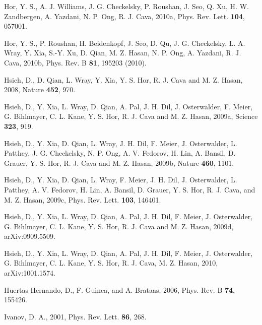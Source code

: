 \documentclass[twocolumn,floatfix,showpacs,rmp,aps]{revtex4}
\begin{document}
\begin{thebibliography}{99}
		Hor, Y. S., A. J. Williams, J. G. Checkelsky, P. Roushan, J. Seo, Q. Xu, H. W. Zandbergen,
		A. Yazdani, N. P. Ong, R. J. Cava, 2010a,
		Phys. Rev. Lett. {\bf 104}, 057001.
		
		Hor, Y. S., P. Roushan, H. Beidenkopf, J. Seo, D. Qu, J. G. Checkelsky,
		L. A. Wray, Y. Xia, S.-Y. Xu, D. Qian, M. Z. Hasan, N. P. Ong,
		A. Yazdani, R. J. Cava, 2010b,
		Phys. Rev. B {\bf 81}, 195203 (2010).
		
		Hsieh, D., D. Qian, L. Wray, Y. Xia, Y. S. Hor, R. J. Cava and M. Z. Hasan, 2008,
		Nature {\bf 452}, 970.
		
		Hsieh, D., Y. Xia, L. Wray, D. Qian, A. Pal, J. H. Dil, J. Osterwalder, F. Meier, G. Bihlmayer,
		C. L. Kane, Y. S. Hor, R. J. Cava and M. Z. Hasan, 2009a,
		Science {\bf 323}, 919.
		
		Hsieh, D., Y. Xia, D. Qian, L. Wray, J. H. Dil, F. Meier, J. Osterwalder, L. Patthey,
		J. G. Checkelsky, N. P. Ong, A. V. Fedorov, H. Lin, A. Bansil, D. Grauer, Y. S. Hor,
		R. J. Cava and M. Z. Hasan, 2009b,
		Nature {\bf 460}, 1101.
		
		Hsieh, D., Y. Xia, D. Qian, L. Wray, F. Meier, J. H. Dil, J. Osterwalder, L. Patthey,
		A. V. Fedorov, H. Lin, A. Bansil, D. Grauer, Y. S. Hor, R. J. Cava, and M. Z. Hasan, 2009c,
		Phys. Rev. Lett. {\bf 103}, 146401.
		
		Hsieh, D., Y. Xia, L. Wray, D. Qian, A. Pal, J. H. Dil, F. Meier, J. Osterwalder,
		G. Bihlmayer, C. L. Kane, Y. S. Hor, R. J. Cava and M. Z. Hasan, 2009d,
		arXiv:0909.5509.
		
		Hsieh, D., Y. Xia, L. Wray, D. Qian, A. Pal, J. H. Dil, F. Meier, J. Osterwalder,
		G. Bihlmayer, C. L. Kane, Y. S. Hor, R. J. Cava, M. Z. Hasan, 2010,
		arXiv:1001.1574.
		
		Huertas-Hernando, D.,  F. Guinea, and A. Brataas, 2006,
		Phys. Rev. B {\bf 74}, 155426.
		
		Ivanov, D. A., 2001,
		Phys. Rev. Lett. {\bf 86}, 268.
		

\end{thebibliography}
\end{document}
